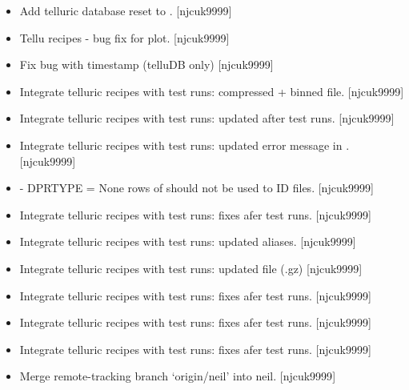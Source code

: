\documentclass[a4paper,10pt,english]{report}
\begin{document}
\label{\detokenize{misc/changelog:id388}}\begin{itemize}
\item {} 
Add telluric database reset to . {[}njcuk9999{]}

\item {} 
Tellu recipes - bug fix for plot. {[}njcuk9999{]}

\item {} 
Fix bug with timestamp (telluDB only) {[}njcuk9999{]}

\item {} 
Integrate telluric recipes with test runs: compressed + binned
 file. {[}njcuk9999{]}

\item {} 
Integrate telluric recipes with test runs: updated after test runs.
{[}njcuk9999{]}

\item {} 
Integrate telluric recipes with test runs: updated error message in
. {[}njcuk9999{]}

\item {} 
 - DPRTYPE = None  rows of  should not be
used to ID files. {[}njcuk9999{]}

\item {} 
Integrate telluric recipes with test runs: fixes afer test runs.
{[}njcuk9999{]}

\item {} 
Integrate telluric recipes with test runs: updated aliases.
{[}njcuk9999{]}

\item {} 
Integrate telluric recipes with test runs: updated  file
(.gz) {[}njcuk9999{]}

\item {} 
Integrate telluric recipes with test runs: fixes afer test runs.
{[}njcuk9999{]}

\item {} 
Integrate telluric recipes with test runs: fixes afer test runs.
{[}njcuk9999{]}

\item {} 
Integrate telluric recipes with test runs: fixes afer test runs.
{[}njcuk9999{]}

\item {} 
Merge remote-tracking branch ‘origin/neil’ into neil. {[}njcuk9999{]}

\end{itemize}
\end{document}
